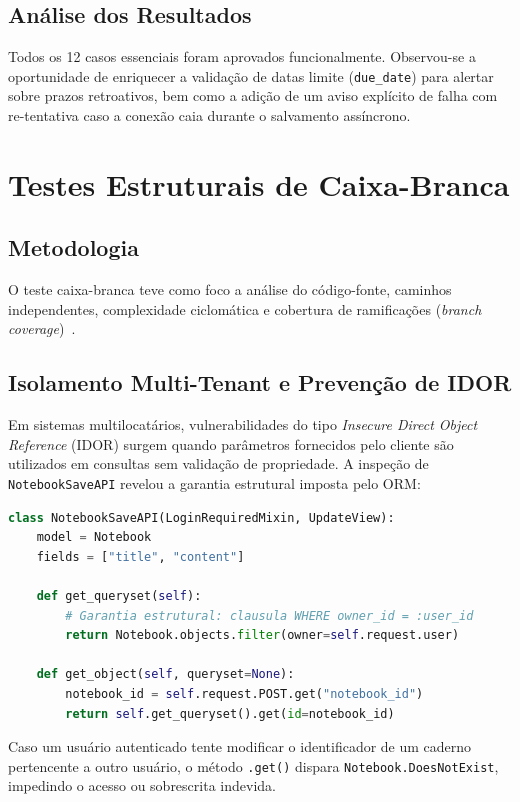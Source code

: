 \documentclass[12pt]{article}
\begin{document}
\subsection{Análise dos Resultados}
Todos os 12 casos essenciais foram aprovados funcionalmente. Observou-se a oportunidade de enriquecer a validação de datas limite (\texttt{due\_date}) para alertar sobre prazos retroativos, bem como a adição de um aviso explícito de falha com re-tentativa caso a conexão caia durante o salvamento assíncrono.

\section{Testes Estruturais de Caixa-Branca}

\subsection{Metodologia}
O teste caixa-branca teve como foco a análise do código-fonte, caminhos independentes, complexidade ciclomática e cobertura de ramificações (\textit{branch coverage})~\cite{myers2011}.

\subsection{Isolamento Multi-Tenant e Prevenção de IDOR}
Em sistemas multilocatários, vulnerabilidades do tipo \textit{Insecure Direct Object Reference} (IDOR) surgem quando parâmetros fornecidos pelo cliente são utilizados em consultas sem validação de propriedade. A inspeção de \texttt{NotebookSaveAPI} revelou a garantia estrutural imposta pelo ORM:

\begin{lstlisting}[language=Python]
class NotebookSaveAPI(LoginRequiredMixin, UpdateView):
    model = Notebook
    fields = ["title", "content"]

    def get_queryset(self):
        # Garantia estrutural: clausula WHERE owner_id = :user_id
        return Notebook.objects.filter(owner=self.request.user)

    def get_object(self, queryset=None):
        notebook_id = self.request.POST.get("notebook_id")
        return self.get_queryset().get(id=notebook_id)
\end{lstlisting}

Caso um usuário autenticado tente modificar o identificador de um caderno pertencente a outro usuário, o método \texttt{.get()} dispara \texttt{Notebook.DoesNotExist}, impedindo o acesso ou sobrescrita indevida.
\end{document}
